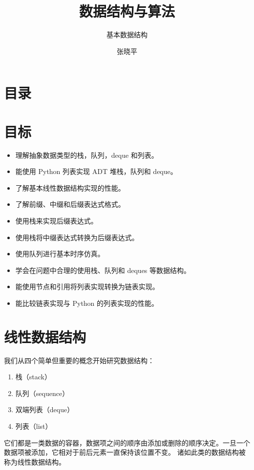 \documentclass[9pt]{beamer}
\begin{document}
\title{数据结构与算法}
\subtitle{基本数据结构}
\author{张晓平}


\begin{frame}[plain]\transboxout
  \titlepage
\end{frame}

\section*{目录}



\section{目标}
\begin{frame}[fragile]\ft{\secname}

  \begin{itemize}
  \item 理解抽象数据类型的栈，队列，deque 和列表。
  \item 能使用 Python 列表实现 ADT 堆栈，队列和 deque。
  \item 了解基本线性数据结构实现的性能。
  \item 了解前缀、中缀和后缀表达式格式。
  \item 使用栈来实现后缀表达式。
  \item 使用栈将中缀表达式转换为后缀表达式。
  \item 使用队列进行基本时序仿真。
  \item 学会在问题中合理的使用栈、队列和 deques 等数据结构。
  \item 能使用节点和引用将列表实现转换为链表实现。
  \item 能比较链表实现与 Python 的列表实现的性能。
  \end{itemize}
\end{frame}

\section{线性数据结构}
\begin{frame}\ft{\secname} 
  我们从四个简单但重要的概念开始研究数据结构：
  \begin{enumerate}
  \item 栈（stack）
  \item 队列（sequence）
  \item 双端列表（deque）
  \item 列表（list）
  \end{enumerate}
  它们都是一类数据的容器，数据项之间的顺序由添加或删除的顺序决定。一旦一个数据项被添加，它相对于前后元素一直保持该位置不变。
  诸如此类的数据结构被称为线性数据结构。
\end{frame}
\end{document}
